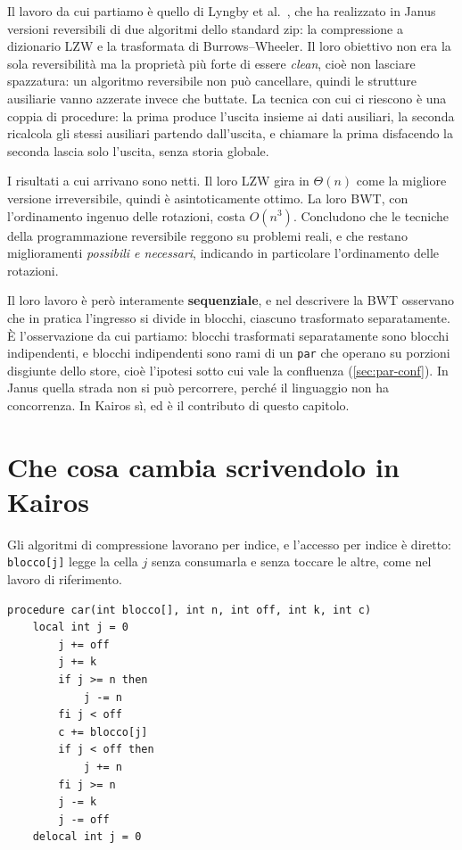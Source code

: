 Il lavoro da cui partiamo è quello di Lyngby et al.~\cite{LyngbyEtAl2024}, che
ha realizzato in Janus versioni reversibili di due algoritmi dello standard zip:
la compressione a dizionario LZW e la trasformata di Burrows--Wheeler. Il loro
obiettivo non era la sola reversibilità ma la proprietà più forte di essere
\emph{clean}, cioè non lasciare spazzatura: un algoritmo reversibile non può
cancellare, quindi le strutture ausiliarie vanno azzerate invece che buttate. La
tecnica con cui ci riescono è una coppia di procedure: la prima produce
l'uscita insieme ai dati ausiliari, la seconda ricalcola gli stessi ausiliari
partendo dall'uscita, e chiamare la prima disfacendo la seconda lascia solo
l'uscita, senza storia globale.

I risultati a cui arrivano sono netti. Il loro LZW gira in $\Theta(n)$ come la
migliore versione irreversibile, quindi è asintoticamente ottimo. La loro BWT,
con l'ordinamento ingenuo delle rotazioni, costa $O(n^3)$. Concludono che le
tecniche della programmazione reversibile reggono su problemi reali, e che
restano miglioramenti \emph{possibili e necessari}, indicando in particolare
l'ordinamento delle rotazioni.

Il loro lavoro è però interamente \textbf{sequenziale}, e nel descrivere la BWT
osservano che in pratica l'ingresso si divide in blocchi, ciascuno trasformato
separatamente. È l'osservazione da cui partiamo: blocchi trasformati
separatamente sono blocchi indipendenti, e blocchi indipendenti sono rami di un
\texttt{par} che operano su porzioni disgiunte dello store, cioè l'ipotesi sotto
cui vale la confluenza (\cref{sec:par-conf}). In Janus quella strada non si può
percorrere, perché il linguaggio non ha concorrenza. In Kairos sì, ed è il
contributo di questo capitolo.

\section{Che cosa cambia scrivendolo in Kairos}

Gli algoritmi di compressione lavorano per indice, e l'accesso per indice è
diretto: \texttt{blocco[j]} legge la cella $j$ senza consumarla e senza toccare
le altre, come nel lavoro di riferimento.

\begin{lstlisting}
procedure car(int blocco[], int n, int off, int k, int c)
    local int j = 0
        j += off
        j += k
        if j >= n then
            j -= n
        fi j < off
        c += blocco[j]
        if j < off then
            j += n
        fi j >= n
        j -= k
        j -= off
    delocal int j = 0
\end{lstlisting}

